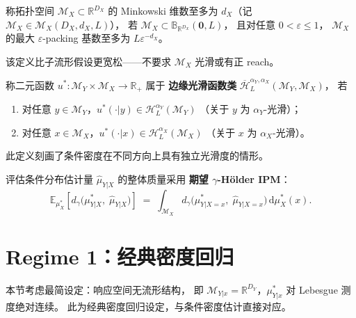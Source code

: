 \begin{Definition}\label{def:minkowski-dim}
    称拓扑空间 $\mathcal{M}_X \subset \mathbb{R}^{D_X}$ 的
    Minkowski 维数至多为 $d_X$（记 $\mathcal{M}_X \in \mathcal{M}_X(D_X, d_X, L)$），
    若 $\mathcal{M}_X \subset \mathbb{B}_{\mathbb{R}^{D_X}}(\mathbf{0}, L)$，
    且对任意 $0 < \varepsilon \leq 1$，
    $\mathcal{M}_X$ 的最大 $\varepsilon$-packing 基数至多为 $L\varepsilon^{-d_X}$。
\end{Definition}

该定义比子流形假设更宽松——不要求 $\mathcal{M}_X$ 光滑或有正 reach。

\begin{Definition}[边缘光滑函数类]\label{def:marginal-smooth}
    称二元函数
    $u^*: \mathcal{M}_Y \times \mathcal{M}_X \to \mathbb{R}_+$
    属于 \textbf{边缘光滑函数类}
    $\overline{\mathcal{H}}^{\alpha_Y,\alpha_X}_L(\mathcal{M}_Y,\mathcal{M}_X)$，
    若
    \begin{enumerate}
        \item 对任意 $y \in \mathcal{M}_Y$，$u^*(\cdot|y) \in \mathcal{H}_L^{\alpha_Y}(\mathcal{M}_Y)$
              （关于 $y$ 为 $\alpha_Y$-光滑）；
        \item 对任意 $x \in \mathcal{M}_X$，$u^*(\cdot|x) \in \mathcal{H}_L^{\alpha_X}(\mathcal{M}_X)$
              （关于 $x$ 为 $\alpha_X$-光滑）。
    \end{enumerate}
    此定义刻画了条件密度在不同方向上具有独立光滑度的情形。
\end{Definition}

评估条件分布估计量 $\widehat{\mu}_{Y|X}$ 的整体质量采用
\textbf{期望 $\gamma$-Hölder IPM}：
\begin{equation}\label{eq:expected-ipm}
    \mathbb{E}_{\mu^*_X}\!\left[d_\gamma\!\big(\mu^*_{Y|X},\; \widehat{\mu}_{Y|X}\big)\right]
    \;=\; \int_{\mathcal{M}_X} d_\gamma\!\big(\mu^*_{Y|X=x},\; \widehat{\mu}_{Y|X=x}\big)\,
          \mathrm{d}\mu^*_X(x).
\end{equation}

\section{Regime 1：经典密度回归}\label{sec:ch2-regime1}

本节考虑最简设定：响应空间无流形结构，
即 $\mathcal{M}_{Y|x} = \mathbb{R}^{D_Y}$，$\mu^*_{Y|x}$ 对 Lebesgue 测度绝对连续。
此为经典密度回归设定，与条件密度估计直接对应。

